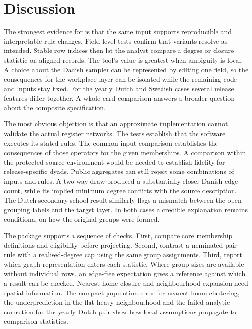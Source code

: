 \section{Discussion}\label{sec:discussion}

The strongest evidence for \builtnet{} is that the same input supports reproducible and interpretable rule changes. Field-level tests confirm that variants resolve as intended. Stable row indices then let the analyst compare a degree or closure statistic on aligned records. The tool's value is greatest when ambiguity is local. A choice about the Danish sampler can be represented by editing one field, so the consequences for the workplace layer can be isolated while the remaining code and inputs stay fixed. For the yearly Dutch and Swedish cases several release features differ together. A whole-card comparison answers a broader question about the composite specification.

The most obvious objection is that an approximate implementation cannot validate the actual register networks. The tests establish that the software executes its stated rules. The common-input comparison establishes the consequences of those operators for the given memberships. A comparison within the protected source environment would be needed to establish fidelity for release-specific dyads. Public aggregates can still reject some combinations of inputs and rules. A two-way draw produced a substantially closer Danish edge count, while its implied minimum degree conflicts with the source description. The Dutch secondary-school result similarly flags a mismatch between the open grouping labels and the target layer. In both cases a credible explanation remains conditional on how the original groups were formed.

The package supports a sequence of checks. First, compare core membership definitions and eligibility before projecting. Second, contrast a nominated-pair rule with a realised-degree cap using the same group assignments. Third, report which graph representation enters each statistic. Where group sizes are available without individual rows, an edge-free expectation gives a reference against which a result can be checked. Nearest-home closure and neighbourhood expansion need spatial information. The compact-population error for nearest-home clustering, the underprediction in the flat-heavy neighbourhood and the failed analytic correction for the yearly Dutch pair show how local assumptions propagate to comparison statistics.

